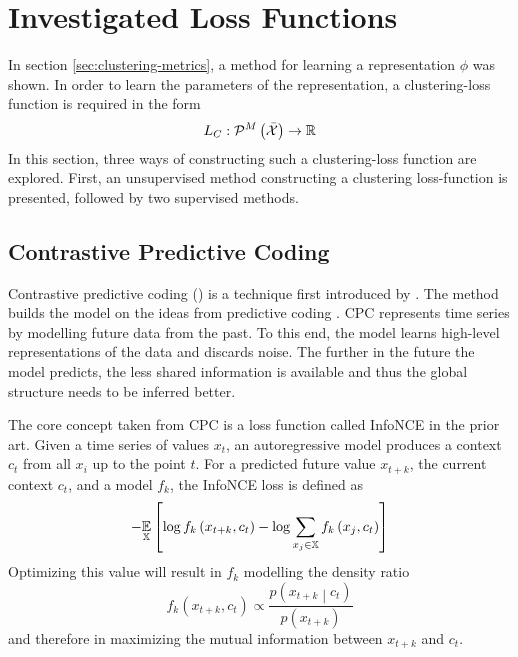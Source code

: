 \section{Investigated Loss Functions}\label{sec:loss-functions}

In section \ref{sec:clustering-metrics}, a method for learning a representation \( \phi \) was shown. In order to learn the parameters of the representation, a clustering-loss function is required in the form
\[ L_C : \mathcal{P}^M \left( \bar{\mathcal{X}} \right) \to \mathbb{R} \]
In this section, three ways of constructing such a clustering-loss function are explored. First, an unsupervised method constructing a clustering loss-function is presented, followed by two supervised methods.

\subsection{Contrastive Predictive Coding}
Contrastive predictive coding () is a technique first introduced by \cite{oord_representation_2019}. The method builds the model on the ideas from predictive coding \cite{elias_predictive_1955}. CPC represents time series by modelling future data from the past. To this end, the model learns high-level representations of the data and discards noise. The further in the future the model predicts, the less shared information is available and thus the global structure needs to be inferred better.

The core concept taken from CPC is a loss function called InfoNCE in the prior art. Given a time series of values \( x_t \), an autoregressive model produces a context \( c_t \) from all \( x_i \) up to the point \( t \). For a predicted future value \( x_{t + k} \), the current context \( c_t \), and a model \( f_k \), the InfoNCE loss is defined as
\[ - \underset{\mathbb{X}}{\mathbb{E}} \left[ \log f_k \left( x_{t + k}, c_t \right) - \log \sum_{x_j \in \mathbb{X}} f_k \left( x_j, c_t \right) \right] \]
Optimizing this	value will result in \( f_k \) modelling the density ratio
\[ f_k \left( x_{t + k}, c_t \right) \propto \frac{p \left( x_{t + k} \middle| c_t \right)}{p \left( x_{t + k} \right)} \]
and therefore in maximizing the mutual information between \( x_{t + k} \) and \( c_t \).


